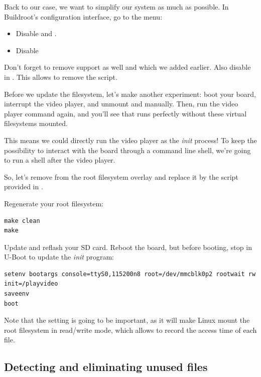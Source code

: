 Back to our case, we want to simplify our system as much as possible.
In Buildroot's configuration interface, go to the  menu:

\begin{itemize}
\item Disable  and
      .
\item Disable 
\end{itemize}

Don't forget to remove  support as well and
 which we added earlier.
Also disable  in .
This allows to remove the  script.

Before we update the filesystem, let's make another experiment: boot
your board, interrupt the video player, and unmount  and
 manually. Then, run the video player command again, and
you'll see that  runs perfectly without these virtual
filesystems mounted.

This means we could directly run the video player as the {\em init}
process! To keep the possibility to interact with the board through
a command line shell, we're going to run a shell after the video player.

So, let's remove  from the root
filesystem overlay and replace it by the  script
provided in .

Regenerate your root filesystem:
\begin{verbatim}
make clean
make
\end{verbatim}

Update and reflash your SD card. Reboot the board, but before booting,
stop in U-Boot to update the {\em init} program:

\begin{verbatim}
setenv bootargs console=ttyS0,115200n8 root=/dev/mmcblk0p2 rootwait rw init=/playvideo
saveenv
boot
\end{verbatim}

Note that the  setting is going to be important, as it will
make Linux mount the root filesystem in read/write mode, which allows to
record the access time of each file.

\subsection{Detecting and eliminating unused files}

